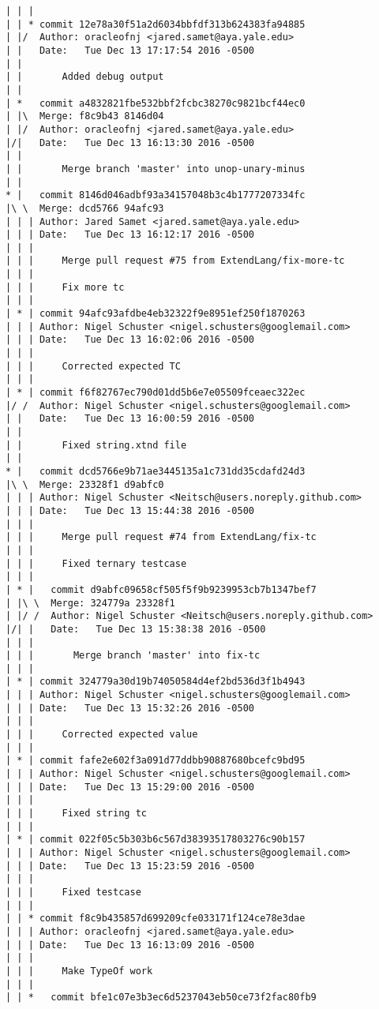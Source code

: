 \begin{lstlisting}
| | |    
| | * commit 12e78a30f51a2d6034bbfdf313b624383fa94885
| |/  Author: oracleofnj <jared.samet@aya.yale.edu>
| |   Date:   Tue Dec 13 17:17:54 2016 -0500
| |   
| |       Added debug output
| |     
| *   commit a4832821fbe532bbf2fcbc38270c9821bcf44ec0
| |\  Merge: f8c9b43 8146d04
| |/  Author: oracleofnj <jared.samet@aya.yale.edu>
|/|   Date:   Tue Dec 13 16:13:30 2016 -0500
| |   
| |       Merge branch 'master' into unop-unary-minus
| |     
* |   commit 8146d046adbf93a34157048b3c4b1777207334fc
|\ \  Merge: dcd5766 94afc93
| | | Author: Jared Samet <jared.samet@aya.yale.edu>
| | | Date:   Tue Dec 13 16:12:17 2016 -0500
| | | 
| | |     Merge pull request #75 from ExtendLang/fix-more-tc
| | |     
| | |     Fix more tc
| | |    
| * | commit 94afc93afdbe4eb32322f9e8951ef250f1870263
| | | Author: Nigel Schuster <nigel.schusters@googlemail.com>
| | | Date:   Tue Dec 13 16:02:06 2016 -0500
| | | 
| | |     Corrected expected TC
| | |    
| * | commit f6f82767ec790d01dd5b6e7e05509fceaec322ec
|/ /  Author: Nigel Schuster <nigel.schusters@googlemail.com>
| |   Date:   Tue Dec 13 16:00:59 2016 -0500
| |   
| |       Fixed string.xtnd file
| |     
* |   commit dcd5766e9b71ae3445135a1c731dd35cdafd24d3
|\ \  Merge: 23328f1 d9abfc0
| | | Author: Nigel Schuster <Neitsch@users.noreply.github.com>
| | | Date:   Tue Dec 13 15:44:38 2016 -0500
| | | 
| | |     Merge pull request #74 from ExtendLang/fix-tc
| | |     
| | |     Fixed ternary testcase
| | |      
| * |   commit d9abfc09658cf505f5f9b9239953cb7b1347bef7
| |\ \  Merge: 324779a 23328f1
| |/ /  Author: Nigel Schuster <Neitsch@users.noreply.github.com>
|/| |   Date:   Tue Dec 13 15:38:38 2016 -0500
| | |   
| | |       Merge branch 'master' into fix-tc
| | |    
| * | commit 324779a30d19b74050584d4ef2bd536d3f1b4943
| | | Author: Nigel Schuster <nigel.schusters@googlemail.com>
| | | Date:   Tue Dec 13 15:32:26 2016 -0500
| | | 
| | |     Corrected expected value
| | |    
| * | commit fafe2e602f3a091d77ddbb90887680bcefc9bd95
| | | Author: Nigel Schuster <nigel.schusters@googlemail.com>
| | | Date:   Tue Dec 13 15:29:00 2016 -0500
| | | 
| | |     Fixed string tc
| | |    
| * | commit 022f05c5b303b6c567d38393517803276c90b157
| | | Author: Nigel Schuster <nigel.schusters@googlemail.com>
| | | Date:   Tue Dec 13 15:23:59 2016 -0500
| | | 
| | |     Fixed testcase
| | |    
| | * commit f8c9b435857d699209cfe033171f124ce78e3dae
| | | Author: oracleofnj <jared.samet@aya.yale.edu>
| | | Date:   Tue Dec 13 16:13:09 2016 -0500
| | | 
| | |     Make TypeOf work
| | |      
| | *   commit bfe1c07e3b3ec6d5237043eb50ce73f2fac80fb9

\end{lstlisting}
